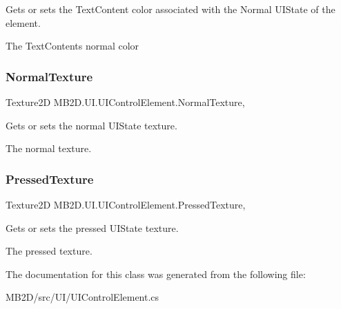 Gets or sets the Text\+Content color associated with the Normal U\+I\+State of the element. 

The Text\+Contents normal color\hypertarget{class_m_b2_d_1_1_u_i_1_1_u_i_control_element_aa0a258c82660be7625aa011fe038095c}{}\label{class_m_b2_d_1_1_u_i_1_1_u_i_control_element_aa0a258c82660be7625aa011fe038095c} 
\subsubsection{\texorpdfstring{Normal\+Texture}{NormalTexture}}
{\footnotesize\ttfamily Texture2D M\+B2\+D.\+U\+I.\+U\+I\+Control\+Element.\+Normal\+Texture\hspace{0.3cm}{\ttfamily [get]}, {\ttfamily [set]}}



Gets or sets the normal U\+I\+State texture. 

The normal texture.\hypertarget{class_m_b2_d_1_1_u_i_1_1_u_i_control_element_a67a317960e2c07d7871568eba8073025}{}\label{class_m_b2_d_1_1_u_i_1_1_u_i_control_element_a67a317960e2c07d7871568eba8073025} 
\subsubsection{\texorpdfstring{Pressed\+Texture}{PressedTexture}}
{\footnotesize\ttfamily Texture2D M\+B2\+D.\+U\+I.\+U\+I\+Control\+Element.\+Pressed\+Texture\hspace{0.3cm}{\ttfamily [get]}, {\ttfamily [set]}}



Gets or sets the pressed U\+I\+State texture. 

The pressed texture.

The documentation for this class was generated from the following file\+:\begin{DoxyCompactItemize}
\item 
M\+B2\+D/src/\+U\+I/U\+I\+Control\+Element.\+cs\end{DoxyCompactItemize}
